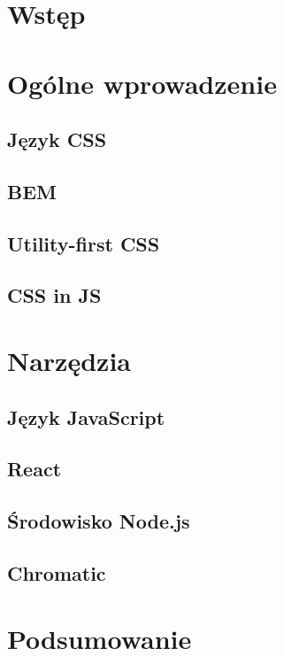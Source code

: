 \documentclass[a4paper,12pt]{book} %
\begin{document}
\sloppy



\thispagestyle{empty}


\newpage{}

\thispagestyle{empty}

\newpage{}



\tableofcontents{}






\chapter*{Wstęp}

\chapter{Ogólne wprowadzenie}
\section{Język CSS}
\section{BEM}
\section{Utility-first CSS}

\section{CSS in JS}





\chapter{Narzędzia}
\section{Język JavaScript}
\section{React}
\section{Środowisko Node.js}
\section{Chromatic}


\chapter*{Podsumowanie}





\end{document}
